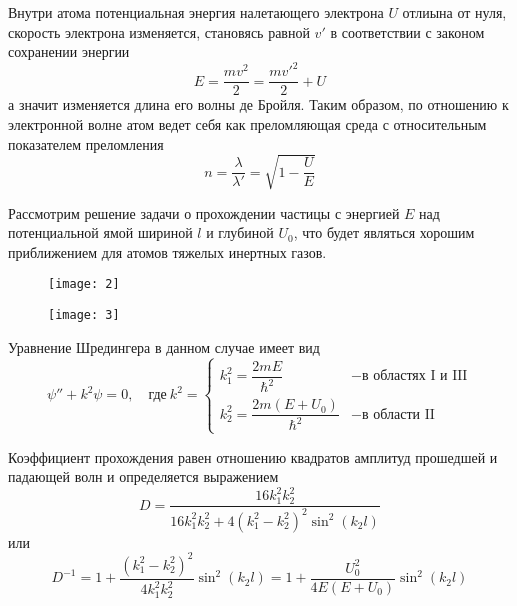 \documentclass[a4paper, 12pt]{article}
\begin{document}
Внутри атома потенциальная энергия налетающего электрона $U$ отлиына
от нуля, скорость электрона изменяется, становясь равной $v'$ в
соответствии с законом сохранении энергии
\begin{equation}
    E = \frac{mv^2}{2}= \frac{m v'^2}{2}+U
    \label{eq:2}
\end{equation}
а значит изменяется длина его волны де Бройля. Таким образом, по
отношению к электронной волне атом ведет себя как преломляющая среда с
относительным показателем преломления
\begin{equation}
    n = \frac{\lambda}{\lambda'}=\sqrt{1- \frac{U}{E}}
    \label{eq:3}
\end{equation}
    
Рассмотрим решение задачи о прохождении частицы с энергией $E$ над
потенциальной ямой шириной $l$ и глубиной $U_0$, что будет являться
хорошим приближением для атомов тяжелых инертных газов. 


\begin{figure}[H]
    \begin{floatrow}

        {
        \texttt{[image: 2]}
        \label{fig:2}
    }

        {
        \texttt{[image: 3]}
        \label{fig:3}
    }
    \end{floatrow}
\end{figure}

Уравнение Шредингера в данном случае имеет вид
\begin{equation}
    \psi'' + k^2 \psi =0, \hspace{1em} \text{где}\ k^2 = 
    \begin{cases}
        k_1^2 = \dfrac{2mE}{\hbar^2} & - \text{в областях I и III}
        \\[1em]
        k_2^2 = \dfrac{2m (E+U_0)}{\hbar^2} & - \text{в области II}
    \end{cases}
    \label{eq:4}
\end{equation}

Коэффициент прохождения равен отношению квадратов амплитуд прошедшей и
падающей волн и определяется выражением
\begin{equation}
    D = \frac{16k_1^2k_2^2}{16k_1^2k_2^2 + 4 (k_1^2-k_2^2)^2 \sin^2
    (k_2 l)}
    \label{eq:5}
\end{equation}
или
\begin{equation}
    D ^{-1} = 1 + \frac{ (k_1^2 - k_2^2)^2 }{4k_1^2 k_2^2}\sin^2 (k_2
    l) = 1 + \frac{U_0^2}{4E (E+U_0)}\sin^2 (k_2 l)
    \label{eq:6}
\end{equation}
\end{document}
